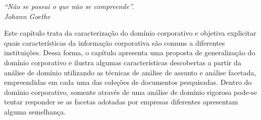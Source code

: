 
	\begin{flushright}
		\textit{``Não se possui o que não se compreende''.
		\\Johann Goethe}
	\end{flushright}


Este capítulo trata da caracterização do domínio corporativo e objetiva explicitar quais características da informação corporativa são comuns a diferentes instituições. Dessa forma, o capítulo apresenta uma proposta de generalização do domínio corporativo e ilustra algumas características descobertas a partir da análise de domínio utilizando as técnicas de análise de assunto e análise facetada, empreendidas em cada uma das coleções de documentos pesquisadas. Dentro do domínio corporativo, somente através de uma análise de domínio rigorosa pode-se tentar responder se as facetas adotadas por empresas diferentes apresentam alguma semelhança.






